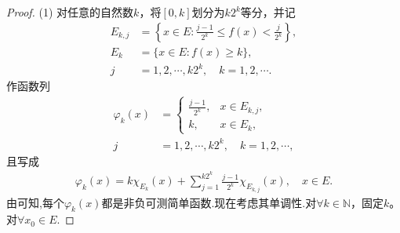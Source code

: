 \documentclass[../../main.tex]{subfiles}%
\begin{document}
\begin{proof}
(1) 对任意的自然数$k$，将$[0, k]$划分为$k2^k$等分，并记
\begin{align*}
E_{k, j} &= \left\{x \in E: \frac{j - 1}{2^k} \leqslant f(x) < \frac{j}{2^k} \right\}, \\
E_{k} &= \{x \in E: f(x) \geqslant k\}, \\
j &= 1, 2, \cdots, k2^k, \quad k = 1, 2, \cdots.
\end{align*}
作函数列
\begin{align*}
\varphi_k(x) &= 
\begin{cases}
\frac{j - 1}{2^k}, & x \in E_{k, j}, \\
k, & x \in E_{k},
\end{cases} \\
j &= 1, 2, \cdots, k2^k, \quad k = 1, 2, \cdots,
\end{align*}
且写成
\begin{align*}
\varphi_k(x) = k\chi_{E_{k}}(x) + \sum_{j = 1}^{k2^k} \frac{j - 1}{2^k} \chi_{E_{k, j}}(x), \quad x \in E.
\end{align*}
由可知,每个$\varphi_k(x)$都是非负可测简单函数.现在考虑其单调性.对$\forall k\in \mathbb{N}$，固定$k$。对$\forall x_0\in E$.


\end{proof}
\end{document}
